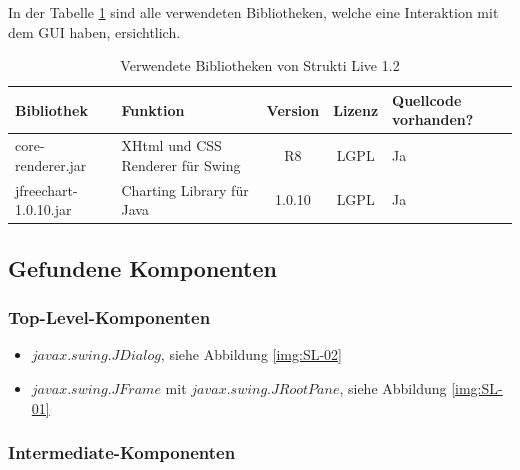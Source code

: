   In der Tabelle \ref{tab:bibliothekenStruktiLive} sind alle verwendeten
  Bibliotheken, welche eine Interaktion mit dem \ac{GUI} haben, ersichtlich.
  \newline
  
  \begin{table}[ht]
    \begin{center}
      \begin{tabular}{lp{4.5cm}ccp{2cm}}
        \toprule
        Bibliothek & Funktion & Version & Lizenz & Quellcode vorhanden?\\
        \midrule
        core-renderer.jar & XHtml und CSS Renderer für Swing & R8 & LGPL & Ja\\
        jfreechart-1.0.10.jar & Charting Library für Java & 1.0.10 & LGPL & Ja\\
        \bottomrule
      \end{tabular}
      \caption{Verwendete Bibliotheken von Strukti Live 1.2}
      \label{tab:bibliothekenStruktiLive}
    \end{center}
  \end{table}
  
  \subsection{Gefundene Komponenten}
  
  \subsubsection{Top-Level-Komponenten}
  
  \begin{itemize}
    \item \(javax.swing.JDialog\), siehe Abbildung \ref{img:SL-02}
    \item \(javax.swing.JFrame\) mit \(javax.swing.JRootPane\), siehe Abbildung
    \ref{img:SL-01}
  \end{itemize}
  
  \subsubsection{Intermediate-Komponenten}
  
